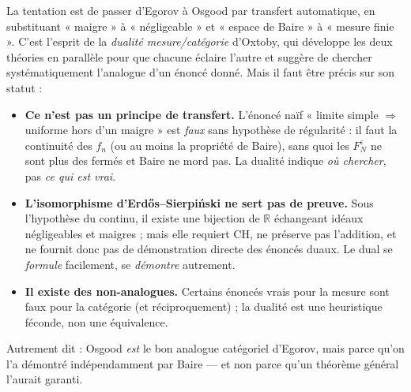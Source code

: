 \documentclass[11pt,a4paper]{article}
\theoremstyle{plain}
\theoremstyle{definition}
\newcommand{\R}{\mathbb{R}}
\newcommand{\1}{\mathbf{1}}
\begin{document}
\begin{boitedual}
La tentation est de passer d'Egorov à Osgood par transfert automatique, en
substituant « maigre » à « négligeable » et « espace de Baire » à « mesure finie ».
C'est l'esprit de la \emph{dualité mesure/catégorie} d'Oxtoby, qui développe les
deux théories en parallèle pour que chacune éclaire l'autre et suggère de chercher
systématiquement l'analogue d'un énoncé donné. Mais il faut être précis sur son
statut :
\begin{itemize}[leftmargin=1.2em,itemsep=3pt,topsep=3pt]
\item \textbf{Ce n'est pas un principe de transfert.} L'énoncé naïf
      « limite simple $\Rightarrow$ uniforme hors d'un maigre » est \emph{faux}
      sans hypothèse de régularité : il faut la continuité des $f_n$ (ou au moins
      la propriété de Baire), sans quoi les $F_N^{\varepsilon}$ ne sont plus des
      fermés et Baire ne mord pas. La dualité indique \emph{où chercher}, pas
      \emph{ce qui est vrai}.
\item \textbf{L'isomorphisme d'Erdős--Sierpiński ne sert pas de preuve.} Sous
      l'hypothèse du continu, il existe une bijection de $\R$ échangeant idéaux
      négligeables et maigres ; mais elle requiert CH, ne préserve pas l'addition,
      et ne fournit donc pas de démonstration directe des énoncés duaux. Le dual
      se \emph{formule} facilement, se \emph{démontre} autrement.
\item \textbf{Il existe des non-analogues.} Certains énoncés vrais pour la mesure
      sont faux pour la catégorie (et réciproquement) ; la dualité est une
      heuristique féconde, non une équivalence.
\end{itemize}
Autrement dit : Osgood \emph{est} le bon analogue catégoriel d'Egorov, mais parce
qu'on l'a démontré indépendamment par Baire — et non parce qu'un théorème général
l'aurait garanti.
\end{boitedual}
\end{document}
